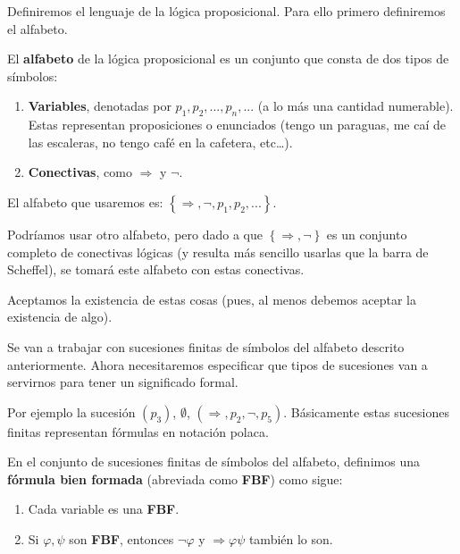 \documentclass[12pt]{report}
\theoremstyle{largebreak}
\begin{document}
    Definiremos el lenguaje de la lógica proposicional. Para ello primero definiremos el alfabeto.

    El \textbf{alfabeto} de la lógica proposicional es un conjunto que consta de dos tipos de símbolos:
    \begin{enumerate}
        \item \textbf{Variables}, denotadas por $p_1,p_2,...,p_n,...$ (a lo más una cantidad numerable). Estas representan proposiciones o enunciados (tengo un paraguas, me caí de las escaleras, no tengo café en la cafetera, etc\dots).
        \item \textbf{Conectivas}, como $\Rightarrow$ y $\neg$.
    \end{enumerate}

    El alfabeto que usaremos es: $\left\{\Rightarrow,\neg,p_1,p_2,... \right\}$.

    \begin{obs}
        Podríamos usar otro alfabeto, pero dado a que $\left\{\Rightarrow,\neg \right\}$ es un conjunto completo de conectivas lógicas (y resulta más sencillo usarlas que la barra de Scheffel), se tomará este alfabeto con estas conectivas.
    \end{obs}

    Aceptamos la existencia de estas cosas (pues, al menos debemos aceptar la existencia de algo).

    Se van a trabajar con sucesiones finitas de símbolos del alfabeto descrito anteriormente. Ahora necesitaremos especificar que tipos de sucesiones van a servirnos para tener un significado formal.

    \begin{exa}
        Por ejemplo la sucesión $(p_3)$, $\emptyset$, $(\Rightarrow, p_2,\neg,p_5)$. Básicamente estas sucesiones finitas representan fórmulas en notación polaca.
    \end{exa}

    \begin{mydef}
        En el conjunto de sucesiones finitas de símbolos del alfabeto, definimos una \textbf{fórmula bien formada} (abreviada como \textbf{FBF}) como sigue:
        \begin{enumerate}
            \item Cada variable es una \textbf{FBF}.
            \item Si $\varphi,\psi$ son \textbf{FBF}, entonces $\neg\varphi$ y $\Rightarrow\varphi\psi$ también lo son.
        \end{enumerate}
    \end{mydef}
\end{document}
